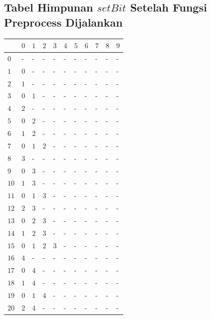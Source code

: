\begin{appendices}

  \chapter{Tabel Himpunan $setBit$ Setelah Fungsi Preprocess Dijalankan}
  \setcounter{table}{0}
  \renewcommand{\thetable}{A.\arabic{table}}
  \renewcommand{\thefigure}{A.\arabic{figure}}
  
  \begin{table}[H]
  	\centering
  	\begin{tabular} {|l|l|l|l|l|l|l|l|l|l|l|} \hline
  		\backslashbox{$Num$}{$index$} & $ 0 $ & $ 1 $ & $ 2 $ & $ 3 $ & $ 4 $ & $ 5 $ & $ 6 $ & $ 7 $ & $ 8 $ & $ 9 $ \\ \hline
  		$ 0 $ &  - &  - &  - &  - &  - &  - &  - &  - &  - &  -   \\ \hline
  		$ 1 $ & $ 0 $ & - &  - &  - &  - &  - &  - &  - &  - &  -   \\ \hline
  		$ 2 $ & $ 1 $ & - &  - &  - &  - &  - &  - &  - &  - &  -   \\ \hline
  		$ 3 $ & $ 0 $ &$ 1 $ & - &  - &  - &  - &  - &  - &  - &  -   \\ \hline
  		$ 4 $ & $ 2 $ & - &  - &  - &  - &  - &  - &  - &  - &  -   \\ \hline
  		$ 5 $ & $ 0 $ &$ 2 $ & - &  - &  - &  - &  - &  - &  - &  -   \\ \hline
  		$ 6 $ & $ 1 $ &$ 2 $ & - &  - &  - &  - &  - &  - &  - &  -   \\ \hline
  		$ 7 $ & $ 0 $ &$ 1 $ &$ 2 $ & - &  - &  - &  - &  - &  - &  -   \\ \hline
  		$ 8 $ & $ 3 $ & - &  - &  - &  - &  - &  - &  - &  - &  -   \\ \hline
  		$ 9 $ & $ 0 $ &$ 3 $ & - &  - &  - &  - &  - &  - &  - &  -   \\ \hline
  		$ 10 $ & $ 1 $ &$ 3 $ & - &  - &  - &  - &  - &  - &  - &  -   \\ \hline
  		$ 11 $ & $ 0 $ &$ 1 $ &$ 3 $ & - &  - &  - &  - &  - &  - &  -   \\ \hline
  		$ 12 $ & $ 2 $ &$ 3 $ & - &  - &  - &  - &  - &  - &  - &  -   \\ \hline
  		$ 13 $ & $ 0 $ &$ 2 $ &$ 3 $ & - &  - &  - &  - &  - &  - &  -   \\ \hline
  		$ 14 $ & $ 1 $ &$ 2 $ &$ 3 $ & - &  - &  - &  - &  - &  - &  -   \\ \hline
  		$ 15 $ & $ 0 $ &$ 1 $ &$ 2 $ &$ 3 $ & - &  - &  - &  - &  - &  -   \\ \hline
  		$ 16 $ & $ 4 $ & - &  - &  - &  - &  - &  - &  - &  - &  -   \\ \hline
  		$ 17 $ & $ 0 $ &$ 4 $ & - &  - &  - &  - &  - &  - &  - &  -   \\ \hline
  		$ 18 $ & $ 1 $ &$ 4 $ & - &  - &  - &  - &  - &  - &  - &  -   \\ \hline
  		$ 19 $ & $ 0 $ &$ 1 $ &$ 4 $ & - &  - &  - &  - &  - &  - &  -   \\ \hline
  		$ 20 $ & $ 2 $ &$ 4 $ & - &  - &  - &  - &  - &  - &  - &  -   \\ \hline
  		 				

\end{tabular}
\end{table}
\end{appendices}

